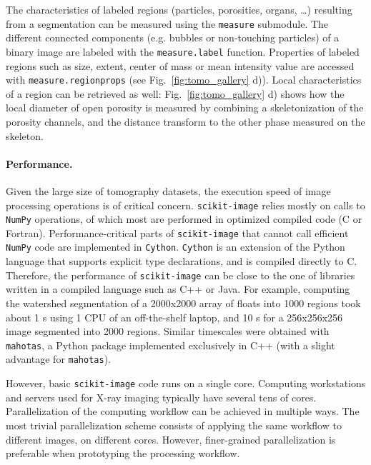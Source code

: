 \documentclass[twocolumn]{bmcart}%
\begin{document}
The characteristics of labeled regions (particles, porosities, organs,
\dots) resulting from a segmentation can be measured using the
\texttt{measure} submodule. The different connected components (e.g.
bubbles or non-touching particles) of a binary image are labeled with the
\texttt{measure.label} function. Properties of labeled regions such as
size, extent, center of mass or mean intensity value are accessed with
\texttt{measure.regionprops} (see Fig.~\ref{fig:tomo_gallery} d)). Local
characteristics of a region can be retrieved as well:
Fig.~\ref{fig:tomo_gallery} d) shows how the local diameter of open
porosity is measured by combining a skeletonization of the porosity
channels, and the distance transform to the other phase measured on the
skeleton.   

\paragraph{Performance.}

Given the large size of tomography datasets, the execution speed of image
processing operations is of critical concern. \texttt{scikit-image}
relies mostly on calls to \texttt{NumPy} operations, of which most are
performed in optimized compiled code (C or Fortran). Performance-critical
parts of \texttt{scikit-image} that cannot call efficient \texttt{NumPy}
code are implemented in \texttt{Cython}. \texttt{Cython}
\citep{Behnel2011} is an extension of the Python language that supports
explicit type declarations, and is compiled directly to C. Therefore, the
performance of \texttt{scikit-image} can be close to the one of libraries
written in a compiled language such as C++ or Java. For example,
computing the watershed segmentation of a 2000x2000 array of floats into
1000 regions took about 1 s using 1 CPU of an off-the-shelf laptop, and
10 s for a 256x256x256 image segmented into 2000 regions. Similar
timescales were obtained with \texttt{mahotas}, a Python package
implemented exclusively in C++ \citep{Coelho2013} (with a slight advantage
for \texttt{mahotas}).

However, basic \texttt{scikit-image} code runs on a single core. Computing
workstations and servers used for X-ray imaging typically have several tens of
cores. Parallelization of the computing workflow can be achieved in multiple
ways. The most trivial parallelization scheme consists of applying the same
workflow to different images, on different cores. However, finer-grained
parallelization is preferable when prototyping the processing workflow.
\end{document}
